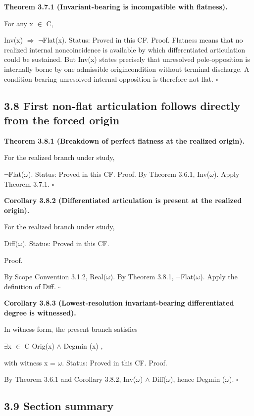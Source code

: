 \documentclass[11pt]{article}
\begin{document}
\textbf{Theorem 3.7.1 (Invariant-bearing is incompatible with flatness).}

For any x $\in$ C,

Inv(x) $\Rightarrow$ $\neg$Flat(x). Status: Proved in this CF. Proof. Flatness means that no realized internal noncoincidence is available by which differentiated articulation could be sustained. But Inv(x) states precisely that unresolved pole-opposition is internally borne by one admissible origincondition without terminal discharge. A condition bearing unresolved internal opposition is therefore not flat. $\square$

\subsection{3.8 First non-flat articulation follows directly from the forced origin}\label{first-non-flat-articulation-follows-directly-from-the-forced-origin}

\textbf{Theorem 3.8.1 (Breakdown of perfect flatness at the realized origin).}

For the realized branch under study,

$\neg$Flat($\omega$). Status: Proved in this CF. Proof. By Theorem 3.6.1, Inv($\omega$). Apply Theorem 3.7.1. $\square$

\textbf{Corollary 3.8.2 (Differentiated articulation is present at the realized origin).}

For the realized branch under study,

Diff($\omega$). Status: Proved in this CF.

Proof.

By Scope Convention 3.1.2, Real($\omega$). By Theorem 3.8.1, $\neg$Flat($\omega$). Apply the definition of Diff. $\square$

\textbf{Corollary 3.8.3 (Lowest-resolution invariant-bearing differentiated degree is witnessed).}

In witness form, the present branch satisfies

$\exists$x $\in$ C Orig(x) $\wedge$ Degmin (x) ,

with witness x = $\omega$. Status: Proved in this CF. Proof.

By Theorem 3.6.1 and Corollary 3.8.2, Inv($\omega$) $\wedge$ Diff($\omega$), hence Degmin ($\omega$). $\square$

\subsection{3.9 Section summary}\label{section-summary}
\end{document}
